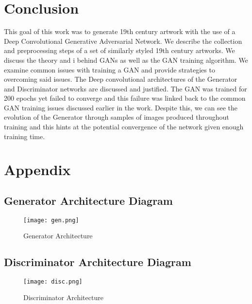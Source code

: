 \documentclass[conference]{IEEEtran}
\begin{document}
\section{Conclusion}

This goal of this work was to generate 19th century artwork with the use of a Deep Convolutional Generative Adversarial Network. We describe the collection and preprocessing steps of a set of similarly styled 19th century artworks. We discuss the theory and i behind GANs as well as the GAN training algorithm. We examine common issues with training a GAN and provide strategies to overcoming said issues. The Deep convolutional architectures of the Generator and Discriminator networks are discussed and justified. The GAN was trained for 200 epochs yet failed to converge and this failure was linked back to the common GAN training issues discussed earlier in the work. Despite this, we can see the evolution of the Generator through samples of images produced throughout training and this hints at the potential convergence of the network given enough training time.






%
%
%

		
		


\onecolumn
\section{Appendix}

\subsection{Generator Architecture Diagram}
\begin{figure}[H]
    \centering
    \texttt{[image: gen.png]}
    \caption{Generator Architecture}
    
\end{figure}

\subsection{Discriminator Architecture Diagram}
\begin{figure}[H]
    \centering
    \texttt{[image: disc.png]}
    \caption{Discriminator Architecture}
    
\end{figure}
\end{document}
